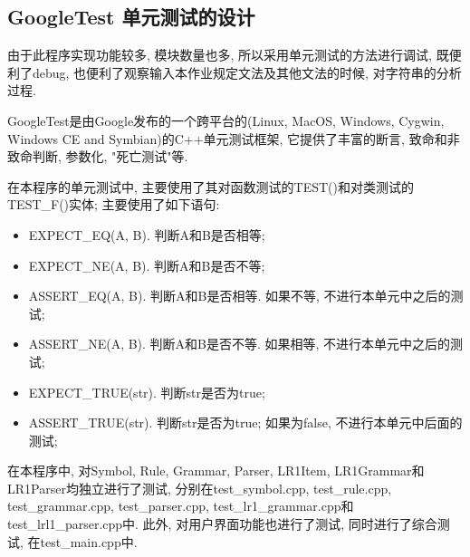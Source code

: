 \subsection{GoogleTest 单元测试的设计}
由于此程序实现功能较多, 模块数量也多, 所以采用单元测试的方法进行调试,
既便利了debug, 也便利了观察输入本作业规定文法及其他文法的时候,
对字符串的分析过程.

GoogleTest是由Google发布的一个跨平台的(Linux, MacOS, Windows, Cygwin, Windows CE
and Symbian)的C++单元测试框架, 它提供了丰富的断言, 致命和非致命判断, 参数化,
"死亡测试"等.\par

在本程序的单元测试中, 主要使用了其对函数测试的TEST()和对类测试的TEST\_F()实体;
主要使用了如下语句:
\begin{itemize}
	\item EXPECT\_EQ(A, B). 判断A和B是否相等;
	\item EXPECT\_NE(A, B). 判断A和B是否不等;
	\item ASSERT\_EQ(A, B). 判断A和B是否相等. 如果不等, 不进行本单元中之后的测试;
	\item ASSERT\_NE(A, B). 判断A和B是否不等. 如果相等, 不进行本单元中之后的测试;
	\item EXPECT\_TRUE(str). 判断str是否为true;
	\item ASSERT\_TRUE(str). 判断str是否为true; 如果为false,
	      不进行本单元中后面的测试;
\end{itemize}

在本程序中, 对Symbol, Rule, Grammar, Parser, LR1Item,
LR1Grammar和LR1Parser均独立进行了测试, 分别在test\_symbol.cpp, test\_rule.cpp,
test\_grammar.cpp, test\_parser.cpp,
test\_lr1\_grammar.cpp和test\_lrl1\_parser.cpp中. 此外,
对用户界面功能也进行了测试, 同时进行了综合测试, 在test\_main.cpp中.

